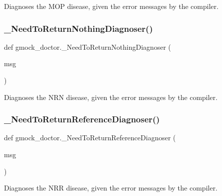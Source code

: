 \begin{DoxyVerb}Diagnoses the MOP disease, given the error messages by the compiler.\end{DoxyVerb}
 \mbox{\label{namespacegmock__doctor_a1d30848b5afc8437c05c03f9d4878a0d}} 
\subsubsection{\texorpdfstring{\_NeedToReturnNothingDiagnoser()}{\_NeedToReturnNothingDiagnoser()}}
{\footnotesize\ttfamily def gmock\+\_\+doctor.\+\_\+\+Need\+To\+Return\+Nothing\+Diagnoser (\begin{DoxyParamCaption}\item[{}]{msg }\end{DoxyParamCaption})\hspace{0.3cm}{\ttfamily [private]}}

\begin{DoxyVerb}Diagnoses the NRN disease, given the error messages by the compiler.\end{DoxyVerb}
 \mbox{\label{namespacegmock__doctor_aa922367471c9e517f839f98e0e3b0a1c}} 
\subsubsection{\texorpdfstring{\_NeedToReturnReferenceDiagnoser()}{\_NeedToReturnReferenceDiagnoser()}}
{\footnotesize\ttfamily def gmock\+\_\+doctor.\+\_\+\+Need\+To\+Return\+Reference\+Diagnoser (\begin{DoxyParamCaption}\item[{}]{msg }\end{DoxyParamCaption})\hspace{0.3cm}{\ttfamily [private]}}

\begin{DoxyVerb}Diagnoses the NRR disease, given the error messages by the compiler.\end{DoxyVerb}
 \mbox{\label{namespacegmock__doctor_a1dc705b817ae15dbf51ebce10e47ed3f}} 
